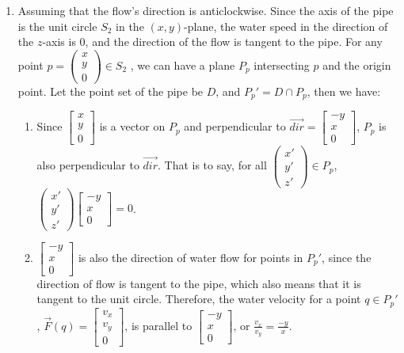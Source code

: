 \begin{exercise}{8}
\begin{enumerate}
    \item Assuming that the flow's direction is anticlockwise. Since the axis of
    the pipe is the unit circle $S_2$ in the $(x, y)$-plane, the water speed in
    the direction of the $z$-axis is 0, and the direction of the flow is tangent
    to the pipe. For any point $p = \begin{pmatrix}x\\y\\0\end{pmatrix} \in S_2$
    , we can have a plane $P_p$ intersecting $p$ and the origin point. Let the
    point set of the pipe be $D$, and $P_p' = D \cap P_p$, then we have:
    
    \begin{enumerate}
      \item Since $\begin{bmatrix}x\\y\\0\end{bmatrix}$ is a vector on $P_p$ and perpendicular
      to $\vec{dir} = \begin{bmatrix}-y\\x\\0\end{bmatrix}$, $P_p$ is also perpendicular to
      $\vec{dir}$. That is to say, for all $\begin{pmatrix}x'\\y'\\z'\end{pmatrix} \in P_p$,
      $\begin{pmatrix}x'\\y'\\z'\end{pmatrix}\begin{bmatrix}-y\\x\\0\end{bmatrix} = 0$.
      
      \item $\begin{bmatrix}-y\\x\\0\end{bmatrix}$ is also the direction of water flow for points
      in $P_p'$, since the direction of flow is tangent to the pipe, which also means that
      it is tangent to the unit circle. Therefore, the water velocity for a point
      $q \in P_p'$, $\vec{F}(q) = \begin{bmatrix}v_x\\v_y\\0\end{bmatrix}$, is parallel to
      $\begin{bmatrix}-y\\x\\0\end{bmatrix}$, or $\frac{v_x}{v_y} = \frac{-y}{x}$.
    \end{enumerate}
    

\end{enumerate}
\end{exercise}
